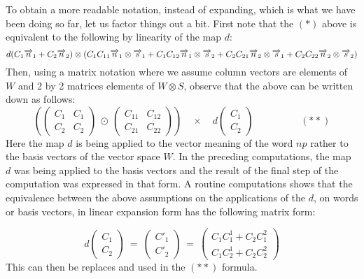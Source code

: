 To obtain a more readable notation,  instead of expanding, which is what we have been doing so far, let us factor things out a bit.  First note that the $(*)$ above is equivalent to the following by linearity of the map $d$:
\[
d(C_1 \overrightarrow{n}_1 + C_2 \overrightarrow{n}_2) \otimes (C_1 C_{11} \overrightarrow{n}_1 \otimes \overrightarrow{s}_1 +  C_1 C_{12} \overrightarrow{n}_1 \otimes \overrightarrow{s}_2 + C_2 C_{21} \overrightarrow{n}_2 \otimes \overrightarrow{s}_1 + C_2 C_{22} \overrightarrow{n}_2 \otimes \overrightarrow{s}_2) 
\]
Then, using a matrix notation where we assume column vectors are elements of $W$ and 2 by 2 matrices elements of $W \otimes S$, observe that the above can be written down as follows:
\[
\left(
 \left ( \begin{array}{cc}
 C_1 & C_1\\ C_2 & C_2
  \end{array} \right)
 \ \odot \ 
 \left ( \begin{array}{cc}
 C_{11} & C_{12}\\ C_{21} & C_{22}
\end{array} \right ) \right)
 \quad \times \quad
 d\left ( \begin{array}{c} C_1 \\ C_2 \end{array} \right )
 \hspace{2cm} (**)
\]
Here the map $d$ is being applied to the vector meaning of the word $np$  rather to the basis vectors of the vector space $W$. In the preceding computations, the map $d$ was being applied to the basis vectors and the result of the final step of the computation was expressed in that form.  A routine computations shows that the equivalence between the above assumptions on the applications of the $d$, on words or basis vectors,   in linear expansion form has the following matrix form:

\[
d\left ( \begin{array}{c} C_1 \\ C_2 \end{array} \right ) \ = \ \left ( \begin{array}{c} C'_1 \\ C'_2 \end{array} \right ) \ = \ 
\left( \begin{array}{c}
C_1C_1^1 + C_2 C_1^2\\
C_1C_2^1 + C_2C_2^2
\end{array}\right)
\]
This can then be replaces and used in the $(**)$ formula. 


